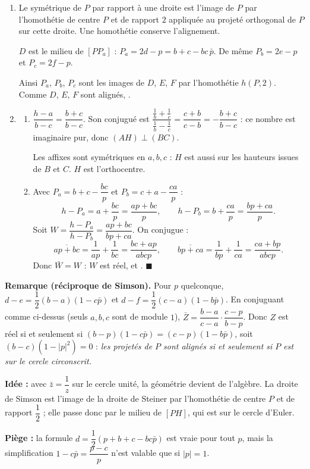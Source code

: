 \begin{enumerate}[itemsep=14pt]
  \item\leavevmode
  \begin{prop}
  Le symétrique de $P$ par rapport à une droite est l'image de $P$ par l'homothétie de centre $P$ et de rapport $2$ appliquée au projeté orthogonal de $P$ sur cette droite. Une homothétie conserve l'alignement.
  \end{prop}
  $D$ est le milieu de $[PP_a]$ : $P_a=2d-p=b+c-bc\,\bar p$. De même $P_b=2e-p$ et $P_c=2f-p$.

  Ainsi $P_a$, $P_b$, $P_c$ sont les images de $D$, $E$, $F$ par l'homothétie $h(P,2)$. Comme $D$, $E$, $F$ sont alignés, .

  \item
  \begin{enumerate}[itemsep=8pt]
    \item $\dfrac{h-a}{b-c}=\dfrac{b+c}{b-c}$. Son conjugué est $\dfrac{\frac1b+\frac1c}{\frac1b-\frac1c}=\dfrac{c+b}{c-b}=-\dfrac{b+c}{b-c}$ : ce nombre est imaginaire pur, donc $(AH)\perp(BC)$.

    Les affixes sont symétriques en $a,b,c$ : $H$ est aussi sur les hauteurs issues de $B$ et $C$. $H$ est l'orthocentre.
    \item Avec $P_a=b+c-\dfrac{bc}p$ et $P_b=c+a-\dfrac{ca}p$ :
    \[h-P_a=a+\dfrac{bc}p=\dfrac{ap+bc}{p},\qquad h-P_b=b+\dfrac{ca}p=\dfrac{bp+ca}{p}.\]
    Soit $W=\dfrac{h-P_a}{h-P_b}=\dfrac{ap+bc}{bp+ca}$. On conjugue :
    \[\overline{ap+bc}=\dfrac1{ap}+\dfrac1{bc}=\dfrac{bc+ap}{abcp},\qquad\overline{bp+ca}=\dfrac1{bp}+\dfrac1{ca}=\dfrac{ca+bp}{abcp}.\]
    Donc $\bar W=W$ : $W$ est réel, et . $\blacksquare$
  \end{enumerate}
\end{enumerate}

\textbf{Remarque (réciproque de Simson).} Pour $p$ quelconque, $d-e=\dfrac12(b-a)(1-c\bar p)$ et $d-f=\dfrac12(c-a)(1-b\bar p)$. En conjuguant comme ci-dessus (seuls $a,b,c$ sont de module $1$), $\bar Z=\dfrac{b-a}{c-a}\cdot\dfrac{c-p}{b-p}$. Donc $Z$ est réel si et seulement si $(b-p)(1-c\bar p)=(c-p)(1-b\bar p)$, soit $(b-c)(1-|p|^2)=0$ : \emph{les projetés de $P$ sont alignés si et seulement si $P$ est sur le cercle circonscrit.}

\textbf{Idée :} avec $\bar z=\dfrac1z$ sur le cercle unité, la géométrie devient de l'algèbre. La droite de Simson est l'image de la droite de Steiner par l'homothétie de centre $P$ et de rapport $\dfrac12$ ; elle passe donc par le milieu de $[PH]$, qui est sur le cercle d'Euler.

\textbf{Piège :} la formule $d=\dfrac12(p+b+c-bc\bar p)$ est vraie pour tout $p$, mais la simplification $1-c\bar p=\dfrac{p-c}{p}$ n'est valable que si $|p|=1$.
